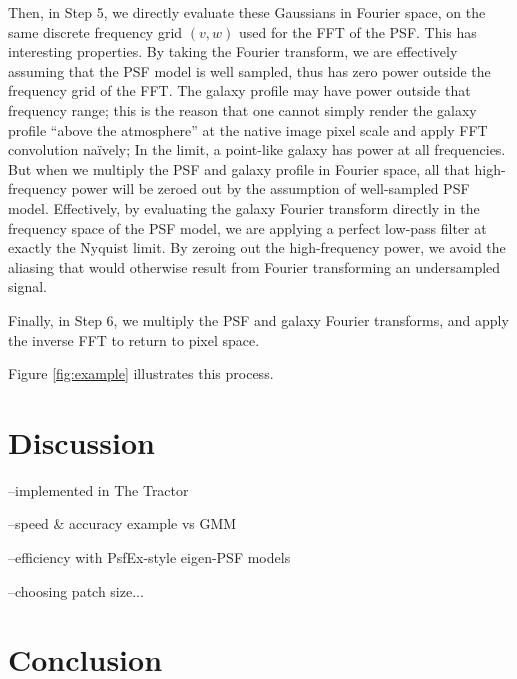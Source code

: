 \documentclass[11pt,preprint]{aastex}
\begin{document}


Then, in Step 5, we directly evaluate these Gaussians in Fourier
space, on the same discrete frequency grid $(v, w)$ used for the FFT
of the PSF.  This has interesting properties.  By taking the Fourier
transform, we are effectively assuming that the PSF model is well
sampled, thus has zero power outside the frequency grid of the FFT.
The galaxy profile may have power outside that frequency range; this
is the reason that one cannot simply render the galaxy profile ``above
the atmosphere'' at the native image pixel scale and apply FFT
convolution na\"ively; In the limit, a point-like galaxy has power at
all frequencies.  But when we multiply the PSF and galaxy profile in
Fourier space, all that high-frequency power will be zeroed out by the
assumption of well-sampled PSF model.  Effectively, by evaluating the
galaxy Fourier transform directly in the frequency space of the PSF
model, we are applying a perfect low-pass filter at exactly the
Nyquist limit.  By zeroing out the high-frequency power, we avoid the
aliasing that would otherwise result from Fourier transforming an
undersampled signal.
%

Finally, in Step 6, we multiply the PSF and galaxy Fourier transforms,
and apply the inverse FFT to return to pixel space.

Figure \ref{fig:example} illustrates this process.

\section{Discussion}

--implemented in The Tractor

--speed \& accuracy example vs GMM

--efficiency with PsfEx-style eigen-PSF models

--choosing patch size...


\section{Conclusion}
\end{document}
